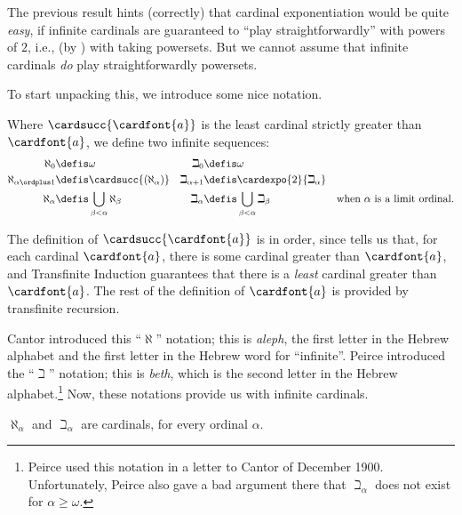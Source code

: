 \documentclass[../../../include/open-logic-section]{subfiles}
\begin{document}

The previous result hints (correctly) that cardinal exponentiation
would be quite \emph{easy}, if infinite cardinals are guaranteed to
``play straightforwardly'' with powers of $2$, i.e., (by
) with taking powersets. But we
cannot assume that infinite cardinals \emph{do} play straightforwardly 
powersets. 

To start unpacking this, we introduce some nice notation.

\begin{defn}
Where $\cardsucc{\cardfont{a}}$ is the least cardinal strictly greater
than $\cardfont{a}$, we define two infinite sequences:
\begin{align*}
	\aleph_{0} &\defis \omega & 		
	\beth_{0} &\defis \omega\\
	\aleph_{\alpha \ordplus 1} &\defis \cardsucc{(\aleph_{\alpha})} &
	\beth_{\alpha+1} &\defis \cardexpo{2}{\beth_{\alpha}}\\
	\aleph_{\alpha} &\defis \bigcup_{\beta< \alpha} \aleph_{\beta} &
	\beth_{\alpha} &\defis \bigcup_{\beta < \alpha}\beth_{\beta} & \text{when $\alpha$ is a limit ordinal}.
	\end{align*}
\end{defn}

The definition of $\cardsucc{\cardfont{a}}$ is in order, since
 tells us that, for each
cardinal $\cardfont{a}$, there is some cardinal greater than
$\cardfont{a}$, and Transfinite Induction guarantees that there is a
\emph{least} cardinal greater than $\cardfont{a}$. The rest of the
definition of $\cardfont{a}$ is provided by transfinite recursion. 

Cantor introduced this ``$\aleph$'' notation; this is \emph{aleph},
the first letter in the Hebrew alphabet and the first letter in the
Hebrew word for ``infinite''. Peirce introduced the ``$\beth$''
notation; this is \emph{beth}, which is the second letter in the
Hebrew alphabet.\footnote{Peirce used this notation in a letter to
Cantor of December 1900. Unfortunately, Peirce also gave a bad
argument there that $\beth_\alpha$ does not exist for $\alpha \geq
\omega$.} Now, these notations provide us with infinite cardinals.

\begin{prop}
$\aleph_\alpha$ and $\beth_\alpha$ are cardinals, for every
ordinal $\alpha$. 
\end{prop}
\end{document}
